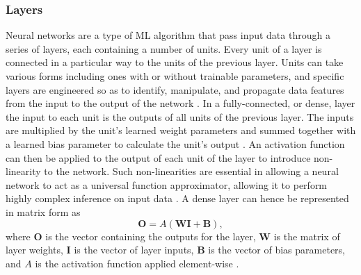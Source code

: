 \documentclass[12pt]{article}
\begin{document}
\subsubsection{Layers}
Neural networks are a type of ML algorithm that pass input data through a series of layers, each containing a number of units. Every unit of a layer is connected in a particular way to the units of the previous layer. Units can take various forms including ones with or without trainable parameters, and specific layers are engineered so as to identify, manipulate, and propagate data features from the input to the output of the network \cite{Haykin98}. In a fully-connected, or dense, layer the input to each unit is the outputs of all units of the previous layer. The inputs are multiplied by the unit's learned weight parameters and summed together with a learned bias parameter to calculate the unit's output \cite{Goodfellow16, Haykin98}. An activation function can then be applied to the output of each unit of the layer to introduce non-linearity to the network. Such non-linearities are essential in allowing a neural network to act as a universal function approximator, allowing it to perform highly complex inference on input data \cite{Hornik89}. A dense layer can hence be represented in matrix form as
\begin{equation}
\bm{O}=A(\bm{W}\bm{I}+\bm{B}), \label{dense}
\end{equation}
where $\bm{O}$ is the vector containing the outputs for the layer, $\bm{W}$ is the matrix of layer weights, $\bm{I}$ is the vector of layer inputs, $\bm{B}$ is the vector of bias parameters, and $A$ is the activation function applied element-wise \cite{Goodfellow16, Haykin98}.
\end{document}
